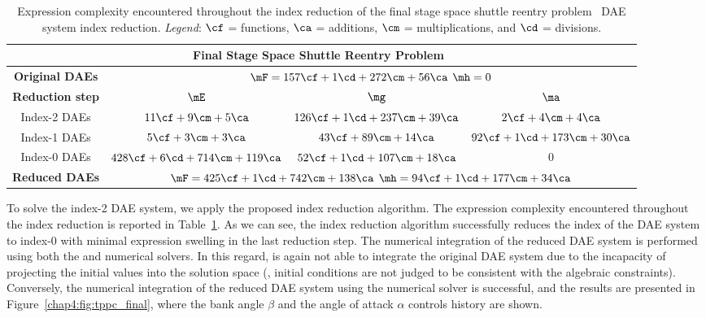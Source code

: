 \begin{table}
  \caption{Expression complexity encountered throughout the index reduction of the final stage space shuttle reentry problem~\cite{brenan1995numerical} \ac{DAE} system index reduction. \emph{Legend}: $\cf$ = functions, $\ca$ = additions, $\cm$ = multiplications, and $\cd$ = divisions.}
  \label{chap4:tab:tppc_final}
  \centering
  {\footnotesize\begin{tabular}{cccc}
    \multicolumn{4}{c}{\textbf{Final Stage Space Shuttle Reentry Problem~\cite{brenan1995numerical}}} \\
    \toprule
    \textbf{Original \acp{DAE}} & \multicolumn{3}{c}{$\mF = 157\cf + 1\cd + 272\cm + 56\ca$ \quad $\mh = 0$} \\
    \midrule
    \textbf{Reduction step} & $\mE$ & $\mg$ & $\ma$ \\
    \midrule
    Index-2 \acp{DAE} & $11\cf + 9\cm + 5\ca$ & $126\cf + 1\cd + 237\cm + 39\ca$ & $2\cf + 4\cm + 4\ca$ \\
    Index-1 \acp{DAE} & $5\cf + 3\cm + 3\ca$ & $43\cf + 89\cm + 14\ca$ & $92\cf + 1\cd + 173\cm + 30\ca$ \\
    Index-0 \acp{DAE} & $428\cf + 6\cd + 714\cm + 119\ca$ & $52\cf + 1\cd + 107\cm + 18\ca$ & $0$ \\
    \midrule
    \textbf{Reduced \acp{DAE}} & \multicolumn{3}{c}{$\mF = 425\cf + 1\cd + 742\cm + 138\ca$ \quad $\mh = 94\cf + 1\cd + 177\cm + 34\ca$} \\
    \bottomrule
  \end{tabular}}
\end{table}

To solve the index-2 \ac{DAE} system, we apply the proposed index reduction algorithm. The expression complexity encountered throughout the index reduction is reported in Table~\ref{chap4:tab:tppc_final}. As we can see, the index reduction algorithm successfully reduces the index of the \ac{DAE} system to index-0 with minimal expression swelling in the last reduction step. The numerical integration of the reduced \ac{DAE} system is performed using both the \Maple{} and \Indigo{} numerical solvers. In this regard, \Maple{} is again not able to integrate the original \ac{DAE} system due to the incapacity of projecting the initial values into the solution space (\ie{}, initial conditions are not judged to be consistent with the algebraic constraints). Conversely, the numerical integration of the reduced \ac{DAE} system using the \Indigo{} numerical solver is successful, and the results are presented in Figure~\ref{chap4:fig:tppc_final}, where the bank angle $\beta$ and the angle of attack $\alpha$ controls history are shown.

